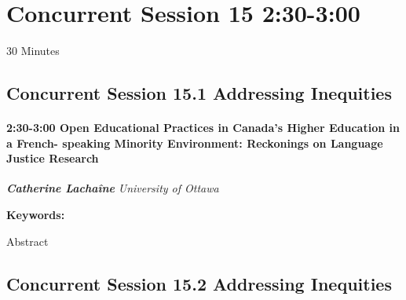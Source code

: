 \documentclass[
]{book}
\begin{document}
\hypertarget{concurrent-session-15-230-300}{%
\section*{Concurrent Session 15 \textbar{} 2:30-3:00}\label{concurrent-session-15-230-300}}

30 Minutes

\hypertarget{concurrent-session-15.1-addressing-inequities}{%
\subsection*{Concurrent Session 15.1 \textbar{} Addressing Inequities}\label{concurrent-session-15.1-addressing-inequities}}

\begin{session}
\hypertarget{open-educational-practices-in-canadas-higher-education-in-a-french--speaking-minority-environment-reckonings-on-language-justice-research}{%
\paragraph*{\texorpdfstring{2:30-3:00 \textbar{} \textbf{Open
Educational Practices in Canada's Higher Education in a French- speaking
Minority Environment: Reckonings on Language Justice} \textbar{}
Research}{2:30-3:00 \textbar{} Open Educational Practices in Canada's Higher Education in a French- speaking Minority Environment: Reckonings on Language Justice \textbar{} Research}}\label{open-educational-practices-in-canadas-higher-education-in-a-french--speaking-minority-environment-reckonings-on-language-justice-research}}

\textbf{\emph{Catherine Lachaîne}} \textbar{} \emph{University of
Ottawa}

\textbf{Keywords:}

Abstract
\end{session}

\hypertarget{concurrent-session-15.2-addressing-inequities}{%
\subsection*{Concurrent Session 15.2 \textbar{} Addressing Inequities}\label{concurrent-session-15.2-addressing-inequities}}
\end{document}
